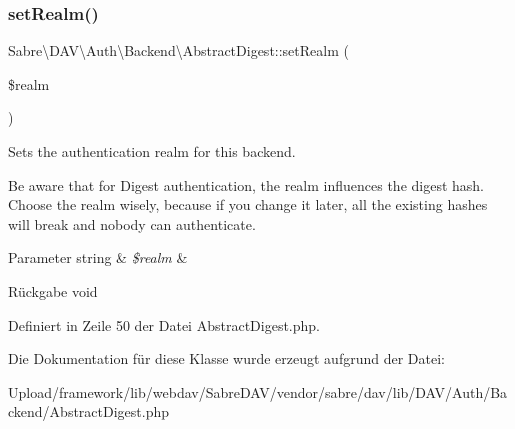 \subsubsection{\texorpdfstring{set\+Realm()}{setRealm()}}
{\footnotesize\ttfamily Sabre\textbackslash{}\+D\+A\+V\textbackslash{}\+Auth\textbackslash{}\+Backend\textbackslash{}\+Abstract\+Digest\+::set\+Realm (\begin{DoxyParamCaption}\item[{}]{\$realm }\end{DoxyParamCaption})}

Sets the authentication realm for this backend.

Be aware that for Digest authentication, the realm influences the digest hash. Choose the realm wisely, because if you change it later, all the existing hashes will break and nobody can authenticate.


\begin{DoxyParams}[1]{Parameter}
string & {\em \$realm} & \\
\hline
\end{DoxyParams}
\begin{DoxyReturn}{Rückgabe}
void 
\end{DoxyReturn}


Definiert in Zeile 50 der Datei Abstract\+Digest.\+php.



Die Dokumentation für diese Klasse wurde erzeugt aufgrund der Datei\+:\begin{DoxyCompactItemize}
\item 
Upload/framework/lib/webdav/\+Sabre\+D\+A\+V/vendor/sabre/dav/lib/\+D\+A\+V/\+Auth/\+Backend/Abstract\+Digest.\+php\end{DoxyCompactItemize}
